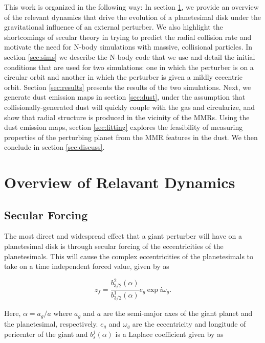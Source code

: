 \documentclass[onecolumn]{aastex63}
\begin{document}
This work is organized in the following way: In section \ref{sec:dynamics}, we provide an overview of the relevant dynamics that drive 
the evolution of a planetesimal disk under the gravitational influence of an external perturber. We also highlight the shortcomings of secular theory in trying to predict the radial collision rate and motivate the need for N-body simulations with massive, collisional particles. In section \ref{sec:sims} we describe the N-body code that we use and detail the initial conditions that are used for two simulations: one in which the perturber is on a circular orbit and another in which the perturber is given a mildly eccentric orbit. Section \ref{sec:results} presents the results of the two simulations. Next, we generate dust emission maps in section \ref{sec:dust}, under the assumption that collisionally-generated dust will quickly couple with the gas and circularize, and show that radial structure is produced in the vicinity of the MMRs. Using the dust emission maps, section \ref{sec:fitting} explores the feasibility of measuring properties of the perturbing planet from the MMR features in the dust. We then conclude in section \ref{sec:discuss}. 

\section{Overview of Relavant Dynamics} \label{sec:dynamics}

\subsection{Secular Forcing}\label{sec:sec_force}

The most direct and widespread effect that a giant perturber will have on a planetesimal disk is through secular forcing of the 
eccentricities of the planetesimals. This will cause the complex eccentricities of the planetesimals to take on a time independent 
forced value, given by \citep{1999ApJ...527..918W} as

\begin{equation}\label{eq:eforced}
	z_{f} = \frac{b^{2}_{3/2} (\alpha)}{b^{1}_{3/2} (\alpha)} e_{g} ~ \mathrm{exp} ~ i \omega_{g}.
\end{equation}

\noindent Here, $\alpha = a_{g} / a$ where $a_{g}$ and $a$ are the semi-major axes of the giant planet and the planetesimal, 
respectively. $e_{g}$ and $\omega_{g}$ are the eccentricity and longitude of pericenter of the giant and $b^{j}_{s} (\alpha)$ is a 
Laplace coefficient given by \citep{2000ssd..book.....M} as
\end{document}

